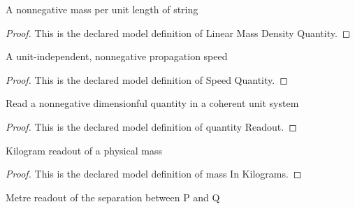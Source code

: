 \begin{definition}
  \label{def:physics:phyx-mini-0298:phyxminiproblems-problemphyxmini0298-linearmassdensityquantity}
  A nonnegative mass per unit length of string
\end{definition}
\begin{proof}
  This is the declared model definition of Linear Mass Density Quantity.
\end{proof}
\begin{definition}
  \label{def:physics:phyx-mini-0298:phyxminiproblems-problemphyxmini0298-speedquantity}
  A unit-independent, nonnegative propagation speed
\end{definition}
\begin{proof}
  This is the declared model definition of Speed Quantity.
\end{proof}
\begin{definition}
  \label{def:physics:phyx-mini-0298:phyxminiproblems-problemphyxmini0298-quantityreadout}
  Read a nonnegative dimensionful quantity in a coherent unit system
\end{definition}
\begin{proof}
  This is the declared model definition of quantity Readout.
\end{proof}
\begin{definition}
  \label{def:physics:phyx-mini-0298:phyxminiproblems-problemphyxmini0298-massinkilograms}
  Kilogram readout of a physical mass
\end{definition}
\begin{proof}
  This is the declared model definition of mass In Kilograms.
\end{proof}
\begin{definition}
  \label{def:physics:phyx-mini-0298:phyxminiproblems-problemphyxmini0298-lengthinmeters}
  Metre readout of the separation between P and Q
\end{definition}
